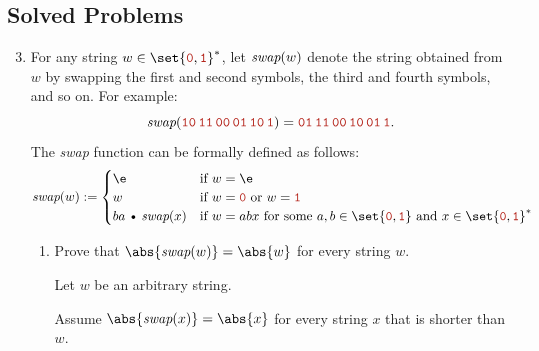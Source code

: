 \documentclass[11pt]{article}
\def\Cdot{\mathbin{\text{\normalfont \textbullet}}}
\def\Sym#1{\texttt{\color{BrickRed}#1}}
\begin{document}
\subsection*{Solved Problems}

\begin{enumerate}
\setcounter{enumi}{2}
\item
For any string $w \in \set{\Sym0,\Sym1}^*$, let $\emph{swap}(w)$ denote the string obtained from $w$ by swapping the first and second symbols, the third and fourth symbols, and so on.  For example:
\[
	\emph{swap}(\Sym{10\,11\,00\,01\,10\,1}) = \Sym{01\,11\,00\,10\,01\,1}.
\]
The \emph{swap} function can be formally defined as follows:
\[
	\emph{swap}(w) := \begin{cases}
		\e & \text{if $w=\e$}\\
		w & \text{if $w = \Sym0$ or $w = \Sym1$}\\
		ba\Cdot\emph{swap}(x) &
			\text{if $w = abx$ for some
					$a,b\in\set{\Sym0,\Sym1}$ and
					$x\in \set{\Sym0,\Sym1}^*$} 
	\end{cases}
\]

\begin{enumerate}
\item
Prove that $\abs{\emph{swap}(w)} = \abs{w}$ for every string $w$.

\begin{Solution}
\parindent0pt
Let $w$ be an arbitrary string.

Assume $\abs{\emph{swap}(x)} = \abs{x}$ for every string $x$ that is shorter than $w$.


\end{Solution}
\end{enumerate}
\end{enumerate}
\end{document}
